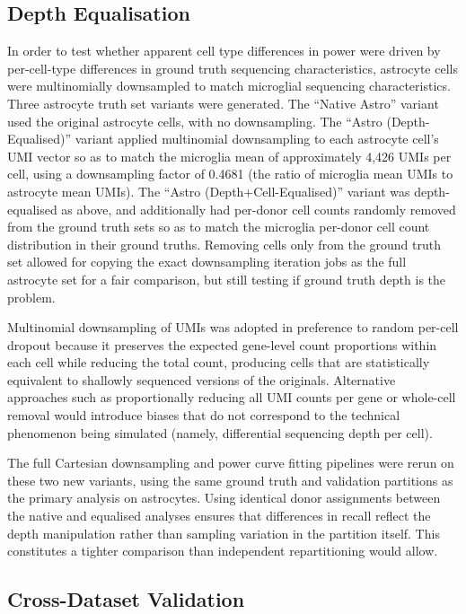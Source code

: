 \documentclass[
]{article}
\begin{document}
\subsection{Depth Equalisation}\label{depth-equalisation}

In order to test whether apparent cell type differences in power were
driven by per-cell-type differences in ground truth sequencing
characteristics, astrocyte cells were multinomially downsampled to match
microglial sequencing characteristics. Three astrocyte truth set
variants were generated. The ``Native Astro'' variant used the original
astrocyte cells, with no downsampling. The ``Astro (Depth-Equalised)''
variant applied multinomial downsampling to each astrocyte cell's UMI
vector so as to match the microglia mean of approximately 4,426 UMIs per
cell, using a downsampling factor of 0.4681 (the ratio of microglia mean
UMIs to astrocyte mean UMIs). The ``Astro (Depth+Cell-Equalised)''
variant was depth-equalised as above, and additionally had per-donor
cell counts randomly removed from the ground truth sets so as to match
the microglia per-donor cell count distribution in their ground truths.
Removing cells only from the ground truth set allowed for copying the
exact downsampling iteration jobs as the full astrocyte set for a fair
comparison, but still testing if ground truth depth is the problem.

Multinomial downsampling of UMIs was adopted in preference to random
per-cell dropout because it preserves the expected gene-level count
proportions within each cell while reducing the total count, producing
cells that are statistically equivalent to shallowly sequenced versions
of the originals. Alternative approaches such as proportionally reducing
all UMI counts per gene or whole-cell removal would introduce biases
that do not correspond to the technical phenomenon being simulated
(namely, differential sequencing depth per cell).

The full Cartesian downsampling and power curve fitting pipelines were
rerun on these two new variants, using the same ground truth and
validation partitions as the primary analysis on astrocytes. Using
identical donor assignments between the native and equalised analyses
ensures that differences in recall reflect the depth manipulation rather
than sampling variation in the partition itself. This constitutes a
tighter comparison than independent repartitioning would allow.

\subsection{Cross-Dataset Validation}\label{cross-dataset-validation}
\end{document}
